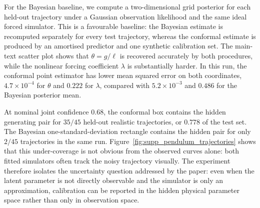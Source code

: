 For the Bayesian baseline, we compute a two-dimensional grid posterior for each held-out trajectory under a Gaussian observation likelihood and the same ideal forced simulator.  This is a favourable baseline: the Bayesian estimate is recomputed separately for every test trajectory, whereas the conformal estimate is produced by an amortised predictor and one synthetic calibration set.  The main-text scatter plot shows that \(\theta=g/\ell\) is recovered accurately by both procedures, while the nonlinear forcing coefficient \(\lambda\) is substantially harder.  In this run, the conformal point estimator has lower mean squared error on both coordinates, \(4.7\times10^{-4}\) for \(\theta\) and \(0.222\) for \(\lambda\), compared with \(5.2\times10^{-3}\) and \(0.486\) for the Bayesian posterior mean.

At nominal joint confidence \(0.68\), the conformal box contains the hidden generating pair for \(35/45\) held-out realistic trajectories, or \(0.778\) of the test set.  The Bayesian one-standard-deviation rectangle contains the hidden pair for only \(2/45\) trajectories in the same run.  Figure~\ref{fig:supp_pendulum_trajectories} shows that this under-coverage is not obvious from the observed curves alone: both fitted simulators often track the noisy trajectory visually.  The experiment therefore isolates the uncertainty question addressed by the paper: even when the latent parameter is not directly observable and the simulator is only an approximation, calibration can be reported in the hidden physical parameter space rather than only in observation space.
